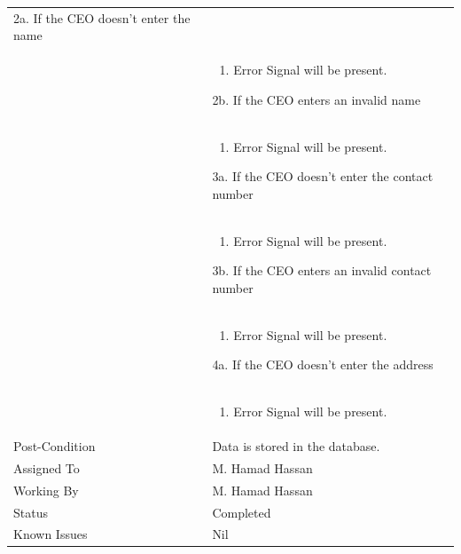 \documentclass[12pt,a4paper]{article}
\begin{document}
\begin{longtable}{| p{3cm}|p{12cm}|}
2a.  If the CEO doesn't enter the name\\ 	
&	\begin{enumerate}
		\item Error Signal will be present.
	\end{enumerate}
2b. If the CEO enters an invalid name \\ 	
&	\begin{enumerate}
		\item Error Signal will be present.
	\end{enumerate}
3a.  If the CEO doesn't enter the contact number\\ 	
&	\begin{enumerate}
		\item Error Signal will be present.
	\end{enumerate}
3b. If the CEO enters an invalid contact number\\ 	
&	\begin{enumerate}
		\item Error Signal will be present.
	\end{enumerate}
4a.  If the CEO doesn't enter the address\\ 	
&	\begin{enumerate}
		\item Error Signal will be present.
	\end{enumerate}
\\ \hline
Post-Condition &  Data is stored in the database. \\\hline
Assigned To &  M. Hamad Hassan
\\ \hline
Working By &    M. Hamad Hassan
\\ \hline
Status & 	Completed	
\\ \hline
Known Issues & Nil
\\\hline
\end{longtable}


\end{document}
